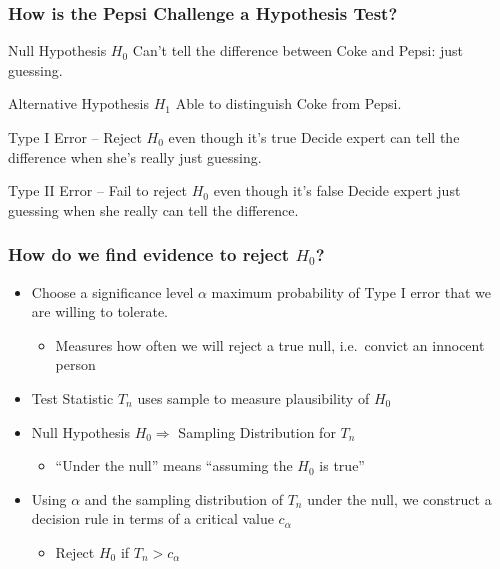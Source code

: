 \documentclass[handout]{beamer}
\begin{document}
\begin{frame}
\begin{columns}
\begin{column}{6cm}
\end{column} 
\end{columns} 

\end{frame}
\begin{frame}
\frametitle{How is the Pepsi Challenge a Hypothesis Test?}
	\begin{block}{Null Hypothesis $H_0$}
		Can't tell the difference between Coke and Pepsi: just guessing. \pause
\end{block}
	\begin{block}{Alternative Hypothesis $H_1$}
	Able to distinguish Coke from Pepsi.\pause
\end{block}
	\begin{block}{Type I Error -- Reject $H_0$ even though it's true} 
	Decide expert can tell the difference when she's really just guessing. \pause
\end{block}
	\begin{block}{Type II Error -- Fail to reject $H_0$ even though it's false}
	Decide expert just guessing when she really can tell the difference. 
\end{block}
\end{frame}
\begin{frame}
\frametitle{How do we find evidence to reject $H_0$?}
	\begin{itemize}
		\item Choose a \alert{significance level $\alpha$} maximum probability of Type I error that we are willing to tolerate. 
			\begin{itemize}
				\item Measures how often we will reject a true null, i.e.\ convict an innocent person \pause
			\end{itemize}
		\item Test Statistic $T_n$ uses sample to measure plausibility of $H_0$ \pause
		\item Null Hypothesis $H_0 \Rightarrow$ Sampling Distribution for $T_n$  
			\begin{itemize}
				\item ``Under the null'' means ``assuming the $H_0$ is true'' \pause
			\end{itemize}
		\item Using $\alpha$ and the sampling distribution of $T_n$ under the null, we construct a \alert{decision rule} in terms of a critical value $c_\alpha$ \pause
			\begin{itemize}
				\item Reject $H_0$ if $T_n > c_\alpha$
			\end{itemize}
	\end{itemize}
	
\end{frame}
\end{document}
